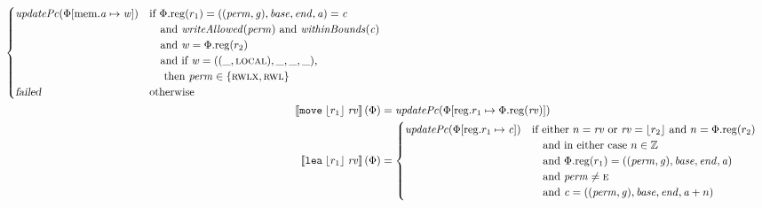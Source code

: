 \documentclass[a4paper]{article}
\newcommand{\update}[2]{[#1 \mapsto #2]}
\newcommand{\sem}[1]{\left\llbracket #1 \right\rrbracket}
\newcommand{\var}[1]{\mathit{#1}}
\newcommand{\rv}{\var{rv}}
\newcommand{\gl}{\var{g}}
\newcommand{\addr}{\var{a}}
\newcommand{\start}{\var{base}}
\newcommand{\addrend}{\var{end}}
\newcommand{\perm}{\var{perm}}
\newcommand{\stdcap}[1][(\perm,\gl)]{\left(#1,\start,\addrend,\addr \right)}
\newcommand{\plainproj}[1]{\mathrm{#1}}
\newcommand{\memreg}[1][\Phi]{#1.\plainproj{reg}}
\newcommand{\updateHeap}[3][\Phi]{#1\update{\plainproj{mem}.#2}{#3}}
\newcommand{\updateReg}[3][\Phi]{#1\update{\plainproj{reg}.#2}{#3}}
\newcommand{\failed}{\textsl{failed}}
\newcommand{\plainfun}[2]{
  \ifthenelse{\equal{#2}{}}
  {\mathit{#1}}
  {\mathit{#1}(#2)}
}
\newcommand{\writeAllowed}[1]{\plainfun{writeAllowed}{#1}}
\newcommand{\withinBounds}[1]{\plainfun{withinBounds}{#1}}
\newcommand{\stdUpdatePc}[1]{\plainfun{updatePc}{#1}}
\newcommand{\ints}{\mathbb{Z}}
\newcommand{\refreg}[1]{\lfloor #1 \rfloor}
\newcommand{\zinstr}[1]{\mathtt{#1}}
\newcommand{\twoinstr}[3]{\zinstr{#1} \; #2 \; #3}
\newcommand{\move}[2]{\twoinstr{move}{#1}{#2}}
\newcommand{\lea}[2]{\twoinstr{lea}{#1}{#2}}
\newcommand{\plainperm}[1]{\textsc{#1}}
\newcommand{\entry}{\plainperm{e}}
\newcommand{\readwritel}{\plainperm{rwl}}
\newcommand{\rwlx}{\plainperm{rwlx}}
\newcommand{\local}{\plainperm{local}}
\begin{document}
\begin{align*}
                                              \begin{cases}
                                                \stdUpdatePc{\updateHeap{\addr}{\var{w}}} &
                                                \arraycolsep=0pt
                                                \begin{array}[t]{l}
                                                  \text{if }\memreg(r_1) = \stdcap = \var{c} \\
                                                  \quad\text{and }\writeAllowed{\perm} \text{ and } \withinBounds{\var{c}} \\
                                                  \quad\text{and }\var{w} = \memreg(r_2)\\
                                                  \quad\text{and if } \var{w} = ((\_,\local),\_,\_,\_) \text{,} \\
                                                  \quad\text{ then } \perm \in \{\rwlx,\readwritel \}
                                                \end{array}\\
                                                \failed & \text{otherwise }
                                              \end{cases}\\
  \sem{\move{\refreg{r_1}}{\rv}}(\Phi)            & = \stdUpdatePc{\updateReg{r_1}{\memreg(\rv)}}
  \\
  \sem{\lea{\refreg{r_1}}{\rv}}(\Phi)            & =
                                             \begin{cases}
                                               \stdUpdatePc{\updateReg{r_1}{\var{c}}} &
                                               \arraycolsep=0pt
                                               \begin{array}[t]{l}
                                                 \text{if either $n = \rv$ or $\rv = \refreg{r_2}$ and $n = \memreg(r_2)$} \\
                                                 \quad\text{and in either case $n \in \ints $} \\
                                                 \quad\text{and $\memreg(r_1) = \stdcap$}\\
                                                 \quad\text{and $\perm \neq \entry$}\\
                                                 \quad\text{and $\var{c} = ((\perm,\gl),\start,\addrend,\addr + n)$}

\end{array}
\end{cases}
\end{align*}
\end{document}
